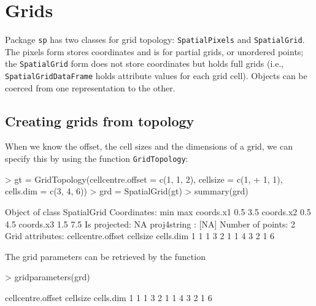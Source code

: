\documentclass{article}
\begin{document}
\section{Grids}
Package {\tt sp} has two classes for grid topology: {\tt SpatialPixels}
and {\tt SpatialGrid}. The pixels form stores coordinates and is for
partial grids, or unordered points; the {\tt SpatialGrid} form does not
store coordinates but holds full grids (i.e., {\tt SpatialGridDataFrame}
holds attribute values for each grid cell). Objects can be coerced from
one representation to the other.

\subsection{Creating grids from topology}
When we know the offset, the cell sizes and the dimensions of a grid, we
can specify this by using the function {\tt GridTopology}:
\begin{Schunk}
\begin{Sinput}
> gt = GridTopology(cellcentre.offset = c(1, 1, 2), cellsize = c(1, 
+     1, 1), cells.dim = c(3, 4, 6))
> grd = SpatialGrid(gt)
> summary(grd)
\end{Sinput}
\begin{Soutput}
Object of class SpatialGrid
Coordinates:
          min max
coords.x1 0.5 3.5
coords.x2 0.5 4.5
coords.x3 1.5 7.5
Is projected: NA 
proj4string : [NA]
Number of points: 2
Grid attributes:
  cellcentre.offset cellsize cells.dim
1                 1        1         3
2                 1        1         4
3                 2        1         6
\end{Soutput}
\end{Schunk}

The grid parameters can be retrieved by the function
\begin{Schunk}
\begin{Sinput}
> gridparameters(grd)
\end{Sinput}
\begin{Soutput}
  cellcentre.offset cellsize cells.dim
1                 1        1         3
2                 1        1         4
3                 2        1         6
\end{Soutput}
\end{Schunk}
\end{document}
